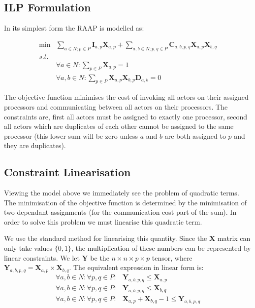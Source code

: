 \subsection{ILP Formulation}

In its simplest form the RAAP is modelled as:

\begin{align}
	\nonumber \min & \sum_{a \in N; p \in P} \mathbf{I}_{a,p}\mathbf{X}_{a,p} + \sum_{a,b \in N; p,q \in P} \mathbf{C}_{a,b,p,q}\mathbf{X}_{a,p}\mathbf{X}_{b,q} \\
	\nonumber s.t. &  \\
	\nonumber & \forall a \in N : \sum_{p \in P}\mathbf{X}_{a,p} = 1 \\
	\nonumber & \forall a,b \in N : \sum_{p \in P}\mathbf{X}_{a,p}\mathbf{X}_{b,p}\mathbf{D}_{a,b} = 0
\end{align}

The objective function minimises the cost of invoking all actors on their assigned processors and communicating between all actors on their processors.
The constraints are, first all actors must be assigned to exactly one processor, second all actors which are duplicates of each other cannot be assigned to the same processor (this lower sum will be zero unless $a$ and $b$ are both assigned to $p$ and they are duplicates).

\subsection{Constraint Linearisation}

Viewing the model above we immediately see the problem of quadratic terms.
The minimisation of the objective function is determined by the minimisation of two dependant assignments (for the communication cost part of the sum).
In order to solve this problem we must linearise this quadratic term.

We use the standard method for linearising this quantity.
Since the $\mathbf{X}$ matrix can only take values $\{0, 1\}$, the multiplication of these numbers can be represented by linear constraints.
We let $\mathbf{Y}$ be the $n \times n \times p \times p$ tensor, where $\mathbf{Y}_{a,b,p,q} = \mathbf{X}_{a,p} \times \mathbf{X}_{b,q}$.
The equivalent expression in linear form is:
\begin{align}
	\nonumber \forall a,b \in N : \forall p,q \in P : & \mathbf{Y}_{a,b,p,q} \leq \mathbf{X}_{a,p} \\
	\nonumber \forall a,b \in N : \forall p,q \in P : & \mathbf{Y}_{a,b,p,q} \leq \mathbf{X}_{b,q} \\
	\nonumber \forall a,b \in N : \forall p,q \in P : & \mathbf{X}_{a,p} + \mathbf{X}_{b,q} - 1 \leq \mathbf{Y}_{a,b,p,q}
\end{align}

